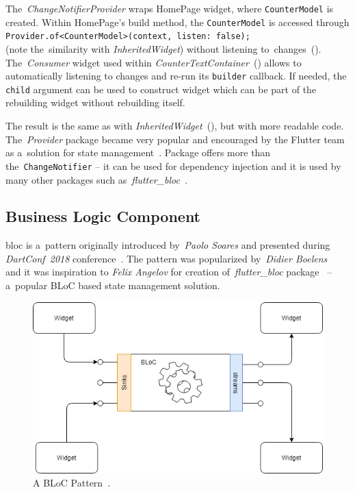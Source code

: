The~\textit{ChangeNotifierProvider} wraps HomePage widget, where \verb|CounterModel| is created. Within HomePage's build method, the \verb|CounterModel| is accessed through \verb|Provider.of<CounterModel>(context, listen: false);| \\(note the~similarity with \textit{InheritedWidget}) without listening to~changes~(). The~\textit{Consumer} widget used within \textit{CounterTextContainer}~() allows to automatically listening to changes and re-run its \verb|builder| callback. If needed, the \verb|child| argument can be used to construct widget which can be part of the rebuilding widget without rebuilding itself. 

The result is the same as with \textit{InheritedWidget}~(), but with more readable code. The~\textit{Provider} package became very popular and encouraged by the Flutter team as a~solution for state management~\cite{flutter-simple-state-management}. Package offers more than the~\verb|ChangeNotifier| -- it can be used for dependency injection and it is used by many other packages such as~\textit{flutter\_bloc}~\cite{package-bloc}.
\subsection{Business Logic Component}
\gls{bloc} is a~pattern originally introduced by~\textit{Paolo Soares} and presented during \textit{DartConf~2018} conference~\cite{bloc-pattern-youtube}. The pattern was popularized by~\textit{Didier Boelens}~\cite{reactive-didier} and it was inspiration to \textit{Felix Angelov} for creation of~\textit{flutter\_bloc} package~\cite{package-bloc} -- a~popular BLoC based state management solution.

\begin{figure}[ht]
    \centering
    \includegraphics[width=0.75\linewidth]{img/flutter/bloc_pattern.png}
    \caption{A BLoC Pattern~\cite{notion-widget-didier}.}
    \label{fig:bloc-pattern}
\end{figure}

